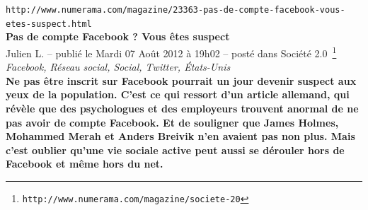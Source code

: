 \documentclass[11pt,twoside,a4paper]{article}
\begin{document}
\setlength\parindent{0pt} %

\texttt{http://www.numerama.com/magazine/23363-pas-de-compte-facebook-vous-etes-suspect.html}~\\

\textbf{\LARGE Pas de compte Facebook ? Vous {\^e}tes suspect}~\\

Julien L. -- publi{\'e} le Mardi 07 Ao{\^u}t 2012 {\`a} 19h02 -- post{\'e} dans Soci{\'e}t{\'e} 2.0~\footnote{\texttt{http://www.numerama.com/magazine/societe-20}}~\\

\emph{\small Facebook, R{\'e}seau social, Social, Twitter, {\'E}tats-Unis}~\\

\textbf{Ne pas {\^e}tre inscrit sur Facebook pourrait un jour devenir suspect aux yeux de la population. C'est ce qui ressort d'un article allemand, qui r{\'e}v{\`e}le que des psychologues et des employeurs trouvent anormal de ne pas avoir de compte Facebook. Et de souligner que James Holmes, Mohammed Merah et Anders Breivik n'en avaient pas non plus. Mais c'est oublier qu'une vie sociale active peut aussi se d{\'e}rouler hors de Facebook et m{\^e}me hors du net. }~\\
\end{document}
